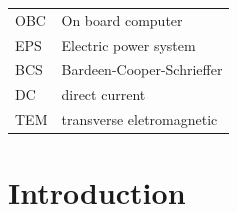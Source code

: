 \documentclass[english,12pt,a4paper,pdftex,elec,utf8]{aaltothesis}
\begin{document}
\begin{tabular}{ll}
OBC         & On board computer \\
EPS      & Electric power system \\
BCS        & Bardeen-Cooper-Schrieffer \\ %
DC         & direct current \\
TEM        & transverse eletromagnetic
\end{tabular}


\cleardoublepage
\storeinipagenumber
{}
\setcounter{page}{1}


\section{Introduction}

\thispagestyle{empty}
\end{document}

